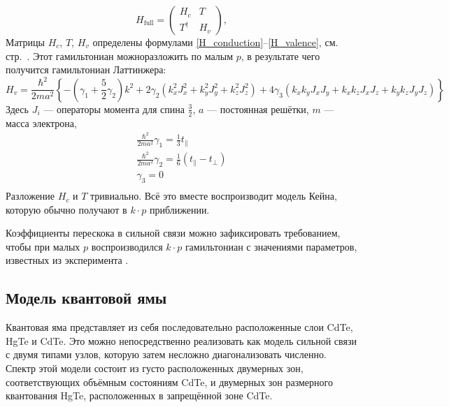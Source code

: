 \begin{equation}
    \label{hfull}
    H_{\mathrm{full}} = \begin{pmatrix}
                            H_c & T \\
                            T^\dagger & H_v
                        \end{pmatrix},
\end{equation}
Матрицы $H_c$, $T$, $H_v$ определены формулами \eqref{H_conduction}--\eqref{H_valence}, см.
стр.~\pageref{H_conduction}.
Этот гамильтониан можноразложить по малым $p$,
в результате чего получится гамильтониан Латтинжера:
\begin{equation}
    H_v = \frac{\hbar^2}{2ma^2}\left\{-\left(\gamma_1 + \frac{5}{2}\gamma_2\right) k^2 + 
        2\gamma_2(k_x^2J_x^2 + k_y^2J_y^2 + k_z^2J_z^2) + 
        4\gamma_3(k_x k_y J_x J_y + k_x k_z J_x J_z + k_y k_z J_y J_z) \right\}
\end{equation}
Здесь $J_i$ --- операторы момента для спина $\frac{3}{2}$, $a$ --- постоянная решётки,
$m$ --- масса электрона,
\begin{equation}
    \begin{gathered}
        \frac{\hbar^2}{2ma^2}\gamma_1 = \frac13 t_\parallel\\
        \frac{\hbar^2}{2ma^2}\gamma_2 = \frac16(t_\parallel - t_\perp)\\
        \gamma_3 = 0\\
    \end{gathered}
\end{equation}
Разложение $H_c$ и $T$ тривиально.
Всё это вместе воспроизводит модель Кейна, которую обычно получают в $k \cdot p$ приближении.

Коэффициенты перескока в сильной связи можно зафиксировать требованием, чтобы при малых $p$ 
воспроизводился $k\cdot p$ гамильтониан с значениями параметров, известных из эксперимента
\cite{Novik2005}. 

\subsection{Модель квантовой ямы}
Квантовая яма представляет из себя последовательно расположенные слои CdTe, HgTe и CdTe.
Это можно непосредственно реализовать как модель сильной связи с двумя типами узлов, которую
затем несложно диагонализовать численно. Спектр этой модели состоит из густо расположенных
двумерных зон, соответствующих объёмным состояниям CdTe, и двумерных зон размерного квантования
HgTe, расположенных в запрещённой зоне CdTe.

